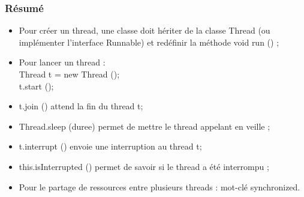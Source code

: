 \documentclass{beamer}
\begin{document}
\begin{frame}
  \frametitle{Résumé}
  \begin{itemize}
  \item Pour créer un thread, une classe doit hériter de la classe
    Thread (ou implémenter l'interface Runnable) et redéfinir la
    méthode void run () ;
  \item Pour lancer un thread :\\Thread t = new Thread ();\\t.start ();
  \item t.join () attend la fin du thread t;
  \item Thread.sleep (duree) permet de mettre le thread appelant en veille ;
  \item t.interrupt () envoie une interruption au thread t;
  \item this.isInterrupted () permet de savoir si le thread a été
    interrompu ;
  \item Pour le partage de ressources entre plusieurs threads :
    mot-clé synchronized.
  \end{itemize}
\end{frame}
\end{document}
